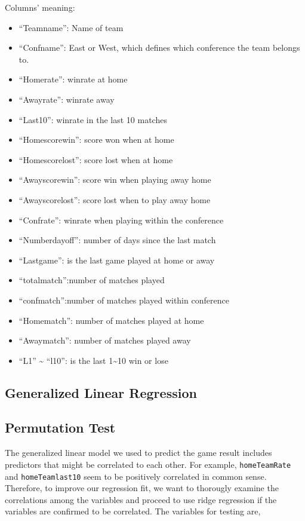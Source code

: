 \documentclass[]{article}
\providecommand{\tightlist}{%
  \setlength{\itemsep}{0pt}\setlength{\parskip}{0pt}}
\begin{document}
Columns' meaning:

\begin{itemize}
\tightlist
\item
  ``Teamname'': Name of team
\item
  ``Confname'': East or West, which defines which conference the team
  belongs to.
\item
  ``Homerate'': winrate at home
\item
  ``Awayrate'': winrate away
\item
  ``Last10'': winrate in the last 10 matches
\item
  ``Homescorewin'': score won when at home
\item
  ``Homescorelost'': score lost when at home
\item
  ``Awayscorewin'': score win when playing away home
\item
  ``Awayscorelost'': score lost when to play away home
\item
  ``Confrate'': winrate when playing within the conference
\item
  ``Numberdayoff'': number of days since the last match
\item
  ``Lastgame'': is the last game played at home or away
\item
  ``totalmatch'':number of matches played
\item
  ``confmatch'':number of matches played within conference
\item
  ``Homematch'': number of matches played at home
\item
  ``Awaymatch'': number of matches played away
\item
  ``L1'' \textasciitilde{} ``l10'': is the last 1\textasciitilde{}10 win
  or lose
\end{itemize}

\subsection{Generalized Linear
Regression}\label{generalized-linear-regression}

\subsection{Permutation Test}\label{permutation-test}

The generalized linear model we used to predict the game result includes
predictors that might be correlated to each other. For example,
\texttt{homeTeamRate} and \texttt{homeTeamlast10} seem to be positively
correlated in common sense. Therefore, to improve our regression fit, we
want to thorougly examine the correlations among the variables and
proceed to use ridge regression if the variables are confirmed to be
correlated. The variables for testing are,
\end{document}
